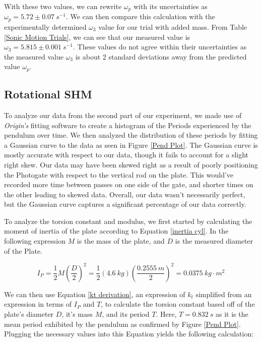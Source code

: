 \documentclass[12pt]{article}
\begin{document}
With these two values, we can rewrite $\omega_p$ with its uncertainties as $\omega_p=5.72\pm0.07\ s^{-1}$. We can then compare this calculation with the experimentally determined $\omega_3$ value for our trial with added mass. From Table \ref{Sonic Motion Trials}, we can see that our measured value is $\omega_3=5.815\pm0.001\ s^{-1}$. These values do not agree within their uncertainties as the measured value $\omega_3$ is about 2 standard deviations away from the predicted value $\omega_p$. \par

\subsection{Rotational SHM}

To analyze our data from the second part of our experiment, we made use of \textit{Origin's} fitting software to create a histogram of the Periods experienced by the pendulum over time. We then analyzed the distribution of these periods by fitting a Gaussian curve to the data as seen in Figure \ref{Pend Plot}. The Gaussian curve is mostly accurate with respect to our data, though it fails to account for a slight right skew. Our data may have been skewed right as a result of poorly positioning the Photogate with respect to the vertical rod on the plate. This would've recorded more time between passes on one side of the gate, and shorter times on the other leading to skewed data. Overall, our data wasn't necessarily perfect, but the Gaussian curve captures a significant percentage of our data correctly. \par

To analyze the torsion constant and modulus, we first started by calculating the moment of inertia of the plate according to Equation \ref{inertia cyl}. In the following expression $M$ is the mass of the plate, and $D$ is the measured diameter of the Plate.

\begin{equation*}
    I_P=\frac{1}{2}M(\frac{D}{2})^2=\frac{1}{2}(4.6\ kg)(\frac{0.2555\ m}{2})^2 = 0.0375 \ kg\cdot m^2
\end{equation*}

We can then use Equation \ref{kt derivation}, an expression of $k_t$ simplified from an expression in terms of $I_P$ and $T$, to calculate the torsion constant based off of the plate's diameter $D$, it's mass $M$, and its period $T$. Here, $T=0.832\ s$ as it is the mean period exhibited by the pendulum as confirmed by Figure \ref{Pend Plot}. Plugging the necessary values into this Equation yields the following calculation:
\end{document}

